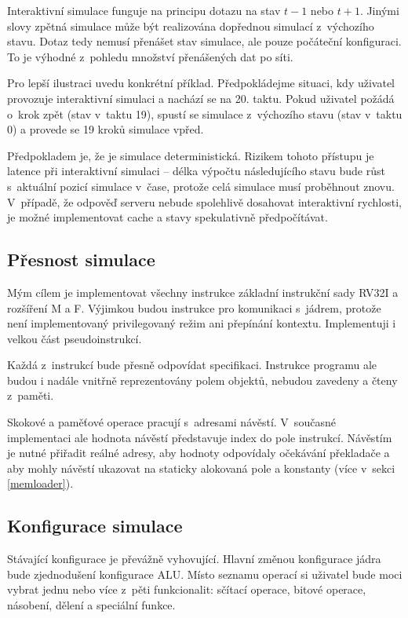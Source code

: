 Interaktivní simulace funguje na principu dotazu na stav $t-1$ nebo $t+1$.
Jinými slovy zpětná simulace může být realizována dopřednou simulací z~výchozího stavu.
Dotaz tedy nemusí přenášet stav simulace, ale pouze počáteční konfiguraci.
To je výhodné z~pohledu množství přenášených dat po síti.

Pro lepší ilustraci uvedu konkrétní příklad.
Předpokládejme situaci, kdy uživatel provozuje interaktivní simulaci a nachází se na 20. taktu.
Pokud uživatel požádá o~krok zpět (stav v~taktu 19), spustí se simulace z~výchozího stavu (stav v~taktu 0) a provede se 19 kroků simulace vpřed.

Předpokladem je, že je simulace deterministická.
Rizikem tohoto přístupu je latence při interaktivní simulaci -- délka výpočtu následujícího stavu bude růst s~aktuální pozicí simulace v~čase, protože celá simulace musí proběhnout znovu.
V~případě, že odpověď serveru nebude spolehlivě dosahovat interaktivní rychlosti, je možné implementovat cache a stavy spekulativně předpočítávat.

\subsection{Přesnost simulace}

Mým cílem je implementovat všechny instrukce základní instrukční sady RV32I a rozšíření M a F.
Výjimkou budou instrukce pro komunikaci s~jádrem, protože není implementovaný privilegovaný režim ani přepínání kontextu.
Implementuji i velkou část pseudoinstrukcí.

Každá z~instrukcí bude přesně odpovídat specifikaci.
Instrukce programu ale budou i nadále vnitřně reprezentovány polem objektů, nebudou zavedeny a čteny z~paměti.

Skokové a paměťové operace pracují s~adresami návěstí.
V~současné implementaci ale hodnota návěstí představuje index do pole instrukcí.
Návěstím je nutné přiřadit reálné adresy, aby hodnoty odpovídaly očekávání překladače a aby mohly návěstí ukazovat na staticky alokovaná pole a konstanty (více v~sekci \ref{memloader}).

\subsection{Konfigurace simulace}

Stávající konfigurace je převážně vyhovující.
Hlavní změnou konfigurace jádra bude zjednodušení konfigurace ALU.
Místo seznamu operací si uživatel bude moci vybrat jednu nebo více z~pěti funkcionalit: sčítací operace, bitové operace, násobení, dělení a speciální funkce.

